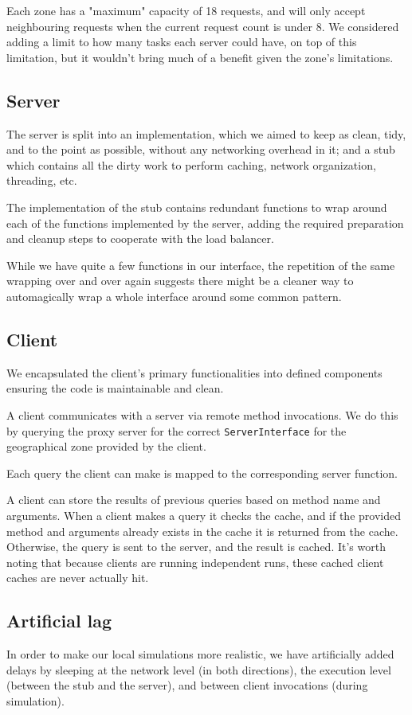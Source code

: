 \documentclass{article}
\def\code#1{\colorbox{gray!20}{\texttt{#1}}}
\begin{document}
Each zone has a "maximum" capacity of 18 requests, and will only accept neighbouring requests when the current request count is under 8. We considered adding a limit to how many tasks each server could have, on top of this limitation, but it wouldn't bring much of a benefit given the zone's limitations.

\subsection{Server}
The server is split into an implementation, which we aimed to keep as clean, tidy, and to the point as possible, without any networking overhead in it; and a stub which contains all the dirty work to perform caching, network organization, threading, etc.

The implementation of the stub contains redundant functions to wrap around each of the functions implemented by the server, adding the required preparation and cleanup steps to cooperate with the load balancer.

While we have quite a few functions in our interface, the repetition of the same wrapping over and over again suggests there might be a cleaner way to automagically wrap a whole interface around some common pattern.

\subsection{Client}
We encapsulated the client's primary functionalities into defined components ensuring the code is maintainable and clean.

A client communicates with a server via remote method invocations. We do this by querying the proxy server for the correct \code{ServerInterface} for the geographical zone provided by the client. 

Each query the client can make is mapped to the corresponding server function. 

A client can store the results of previous queries based on method name and arguments. When a client makes a query it checks the cache, and if the provided method and arguments already exists in the cache it is returned from the cache. Otherwise, the query is sent to the server, and the result is cached. It's worth noting that because clients are running independent runs, these cached client caches are never actually hit.

\subsection{Artificial lag}
In order to make our local simulations more realistic, we have artificially added delays by sleeping at the network level (in both directions), the execution level (between the stub and the server), and between client invocations (during simulation).
\end{document}
